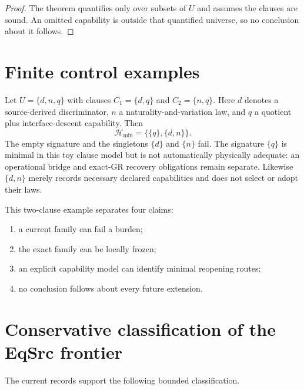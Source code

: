 \documentclass[11pt]{article}
\begin{document}
\begin{proof}
The theorem quantifies only over subsets of $U$ and assumes the clauses are
sound.  An omitted capability is outside that quantified universe, so no
conclusion about it follows.
\end{proof}

\section{Finite control examples}

Let $U=\{d,n,q\}$ with clauses $C_1=\{d,q\}$ and
$C_2=\{n,q\}$.  Here $d$ denotes a source-derived discriminator, $n$ a
naturality-and-variation law, and $q$ a quotient plus interface-descent
capability.  Then
\[
 \mathcal{H}_{\min}=\bigl\{\{q\},\{d,n\}\bigr\}.
\]
The empty signature and the singletons $\{d\}$ and $\{n\}$ fail.  The
signature $\{q\}$ is minimal in this toy clause model but is not automatically
physically adequate: an operational bridge and exact-GR recovery obligations
remain separate.  Likewise $\{d,n\}$ merely records necessary declared
capabilities and does not select or adopt their laws.

This two-clause example separates four claims:
\begin{enumerate}
  \item a current family can fail a burden;
  \item the exact family can be locally frozen;
  \item an explicit capability model can identify minimal reopening routes;
  \item no conclusion follows about every future extension.
\end{enumerate}

\section{Conservative classification of the EqSrc frontier}

The current records support the following bounded classification.
\end{document}
